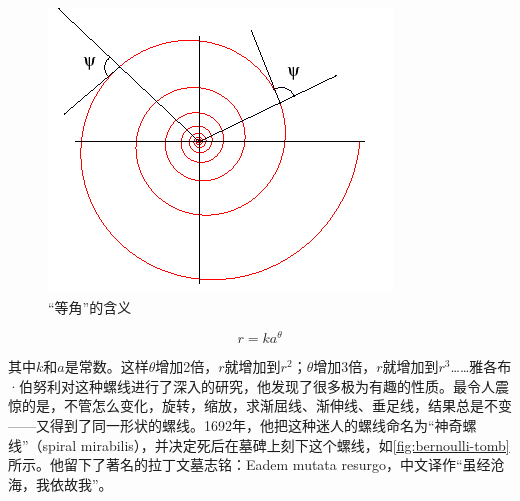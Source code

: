 \documentclass[b5paper]{ctexart}
\begin{document}
\begin{figure}[htbp]
 \centering
 \includegraphics[scale=0.4]{img/equiangular}
 \caption{“等角”的含义}
 \label{fig:equiangular}
\end{figure}

\[
r = ka^\theta
\]

其中$k$和$a$是常数。这样$\theta$增加2倍，$r$就增加到$r^2$；$\theta$增加3倍，$r$就增加到$r^3$……雅各布·伯努利对这种螺线进行了深入的研究，他发现了很多极为有趣的性质。最令人震惊的是，不管怎么变化，旋转，缩放，求渐屈线、渐伸线、垂足线，结果总是不变——又得到了同一形状的螺线。1692年，他把这种迷人的螺线命名为“神奇螺线”（spiral mirabilis），并决定死后在墓碑上刻下这个螺线，如\cref{fig:bernoulli-tomb}所示\cite{MacTour-Equiangular}。他留下了著名的拉丁文墓志铭：Eadem mutata resurgo，中文译作“虽经沧海，我依故我”\cite{Maor-2010}。
\end{document}
